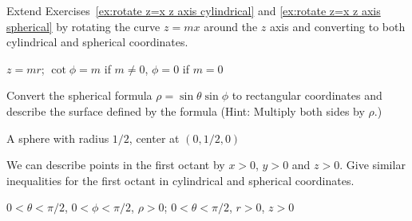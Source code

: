 \begin{enumialphparenastyle}
\begin{ex}
Extend Exercises~\ref{ex:rotate z=x z axis cylindrical} 
and \ref{ex:rotate z=x z axis spherical} by rotating the curve $z=mx$
around the $z$ axis and converting to both cylindrical and spherical
coordinates.
\begin{sol}
	$z=mr$; $\cot\phi=m$ if $m\neq0$, $\phi=0$ if $m=0$
\end{sol}
\end{ex}

\begin{ex}
Convert the spherical formula $\rho=\sin \theta \sin \phi$ to
rectangular coordinates and describe the surface defined by the
formula (Hint: Multiply both sides by $\rho$.)
\begin{sol}
	A sphere with radius $1/2$, center at $(0,1/2,0)$
\end{sol}
\end{ex}

\begin{ex}
We can describe points in the first octant by $x >0$, $y>0$ and
$z>0$.  Give similar inequalities for the first octant in cylindrical
and spherical coordinates.
\begin{sol}
	$0<\theta<\pi/2$, $0<\phi<\pi/2$, $\rho>0$;
$0<\theta<\pi/2$, $r>0$, $z>0$
\end{sol}
\end{ex}

\end{enumialphparenastyle}
